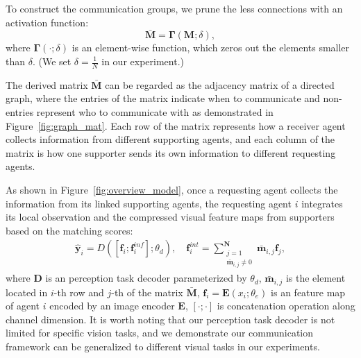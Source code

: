 %
To construct the communication groups, we prune the less connections with an activation function:
\begin{equation}\label{eq:matching}
\bar{\bm{M}} = \bm{\Gamma}(
   \bm{M} ;\delta),
\end{equation}
where $\bm{\Gamma}(\cdot;\delta)$ is an element-wise function, which zeros out the elements smaller than $\delta$. (We set $\delta=\frac{1}{N}$ in our experiment.)

The derived matrix $\bar{\bm{M}}$ can be regarded as the adjacency matrix of a directed graph, where the entries of the matrix indicate when to communicate and non-entries represent who to communicate with as demonstrated in Figure~\ref{fig:graph_mat}. 
Each row of the matrix represents how a receiver agent collects information from different supporting agents, and each column of the matrix is how one supporter sends its own information to different requesting agents.  


As shown in Figure~\ref{fig:overview_model}, once a requesting agent collects the information from its linked supporting agents, the requesting agent $i$ integrates its local observation and the compressed visual feature maps from supporters based on the matching scores:
\begin{align}\label{eq:softmax}
        \bm{\hat{y}}_i=D([{\bm{f}}_i; \bm{f}_{i}^{inf}];\theta_d), \quad
        \bm{f}_{i}^{int} = \sum_{\substack{j=1 \\  \bm{\bar{m}}_{i,j}\neq 0 }}^{\bm{N}}\bm{\bar{m}}_{i,j}\bm{f}_j,
\end{align}
where $\bm{D}$ is an perception task decoder parameterized by $\theta_d$, $\bm{\bar{m}}_{i,j}$ is the element located in
$i$-th row and $j$-th of the matrix $\bm{\bar{M}}$, $\bm{f}_i=\bm{E}(x_i;\theta_e)$ is an feature map of agent $i$ encoded by an image encoder $\bm{E}$, $[\cdot;\cdot]$ is concatenation operation along channel dimension. It is worth noting that our perception task decoder is not limited for specific vision tasks, and we demonstrate our communication framework can be generalized to different visual tasks in our experiments. 
